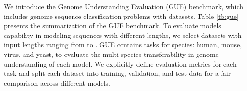 \documentclass{article}
\begin{document}
\begin{table*}[t]
	\centering
	\footnotesize
	\caption{ \footnotesize  
		Summarization of the Genome Understanding Evaluation (GUE) benchmark.
	}\label{tb:gue}
\end{table*}



We introduce the Genome Understanding Evaluation (GUE) benchmark, which includes  genome sequence classification problems with  datasets. Table \ref{tb:gue} presents the summarization of the GUE benchmark. To evaluate models' capability in modeling sequences with different lengths, we select datasets with input lengths ranging from  to . GUE contains tasks for  species: human, mouse, virus, and yeast, to evaluate the multi-species transferability in genome understanding of each model. We explicitly define evaluation metrics for each task and split each dataset into training, validation, and test data for a fair comparison across different models.
\end{document}
